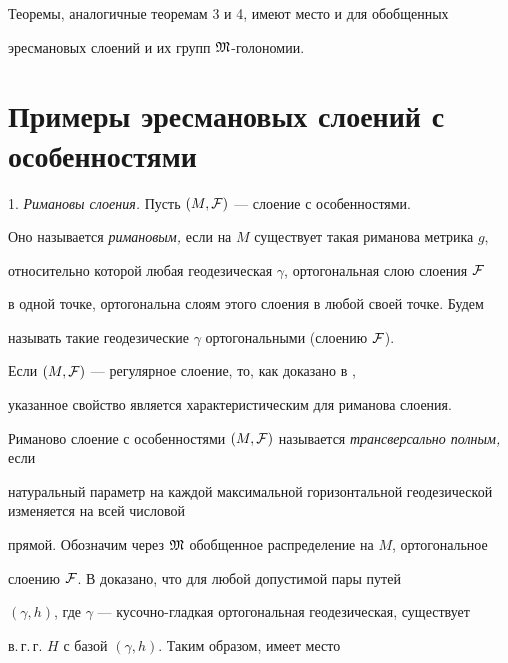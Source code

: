 \begin{note}


Теоремы, аналогичные теоремам 3 и 4, имеют место и для обобщенных


эресмановых слоений и их групп $\frak M$-голономии.


\end{note}








\section{Примеры эресмановых слоений с особенностями}





1. {\it Римановы слоения.} Пусть $(M,\cal F)$ --- слоение с особенностями.


Оно называется {\it римановым,} если на $M$ существует такая риманова метрика $g$,


относительно которой любая геодезическая $\gamma$, ортогональная слою слоения $\cal F$


в одной точке, ортогональна слоям этого слоения в любой своей точке. Будем


называть такие геодезические $\gamma$ ортогональными (слоению $\cal F$).


Если $(M,\cal F)$ --- регулярное слоение, то, как доказано в \cite{Rei},


указанное свойство является характеристическим для риманова слоения.





Риманово слоение с особенностями $(M,\cal F)$ называется {\it трансверсально полным,} если


натуральный параметр на каждой максимальной горизонтальной геодезической изменяется на всей числовой


прямой. Обозначим через $\frak M$ обобщенное распределение на $M$, ортогональное


слоению $\cal F$. В \cite{Zs} доказано, что для любой допустимой пары путей


$(\gamma,h)$, где $\gamma$ --- кусочно-гладкая ортогональная геодезическая, существует


в.\,г.\,г. $H$ с базой $(\gamma,h)$. Таким образом, имеет место





